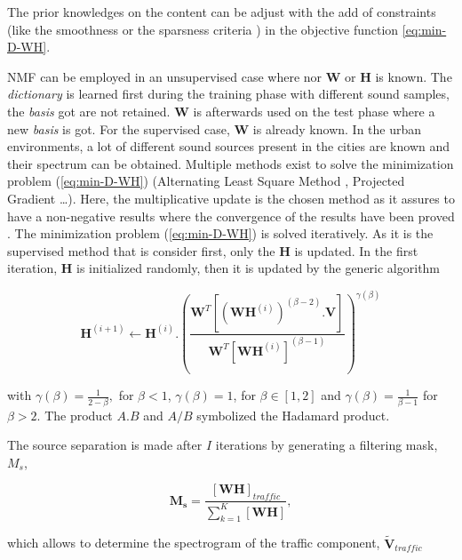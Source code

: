 \documentclass[twocolumn,a4paper,10pt]{article}
\begin{document}
The prior knowledges on the content can be adjust with the add of constraints (like the smoothness or the sparsness criteria \cite{virtanen_monaural_2007}) in the objective function \ref{eq:min-D-WH}. 

NMF can be employed in an unsupervised case where nor $\mathbf{W}$ or $\mathbf{H}$ is known. The \textit{dictionary} is learned first during the training phase with different sound samples, the \textit{basis} got are not retained. $\mathbf{W}$ is afterwards used on the test phase where a new \textit{basis} is got. For the supervised case, $\mathbf{W}$ is already known. In the urban environments, a lot of different sound sources present in the cities are known and their spectrum can be obtained. 
Multiple methods exist to solve the minimization problem (\ref{eq:min-D-WH}) (Alternating Least Square Method \cite{cichocki_regularized_2007}, Projected Gradient \cite{lin_projected_2007} \dots). Here, the multiplicative update is the chosen method \cite{lee_algorithms_2000} as it assures to have a non-negative results where the convergence of the results have been proved \cite{fevotte_algorithms_2011}. The minimization problem (\ref{eq:min-D-WH}) is solved iteratively. As it is the supervised method that is consider first, only the $\mathbf{H}$ is updated. In the first iteration, $\mathbf{H}$ is initialized randomly, then it is updated by the generic  algorithm 

\begin{equation}
\textbf{H}^{(i+1)} \leftarrow \textbf{H}^{(i)}.\left(\frac{\textbf{W}^T \left[\left(\textbf{WH}^{(i)} \right)^{(\beta-2)}.\textbf{V} \right]}{\textbf{W}^T \left[\textbf{WH}^{(i)} \right]^{(\beta-1)}}\right)^{\gamma(\beta)}
\end{equation}

with $\gamma(\beta) = \frac{1}{2-\beta},$ for $\beta < 1$, $ \gamma(\beta) = 1$, for $\beta \in \left[1,2\right]$ and $\gamma(\beta) = \frac{1}{\beta-1}$ for $\beta > 2$. The product $A.B$ and $A/B$ symbolized the Hadamard product.

The source separation is made after $I$ iterations by generating a filtering mask, $M_s$, 
 
\begin{equation} \label{eq:definitionMask}
\mathbf{M_s} = \frac{\left[\mathbf{W} \mathbf{H}\right]_{traffic}}{\sum_{k = 1}^K\left[\mathbf{W H}\right]}, 
\end{equation}

which allows to determine the spectrogram of the traffic component, $ \mathbf{\tilde{V}}_{traffic}$
\end{document}
